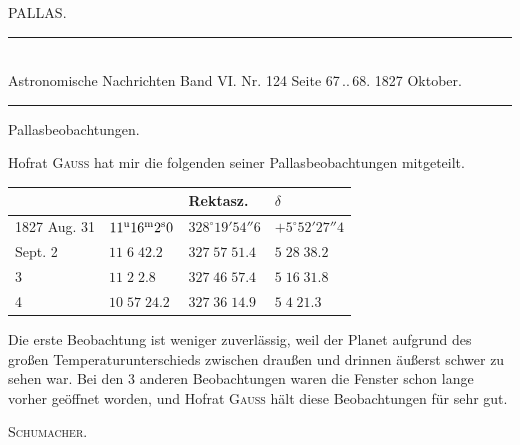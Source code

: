 \clearpage
{}
\hypertarget{native-465-pallas}{}
\begin{center}{\large PALLAS.}\end{center}

\begin{center}
\rule{0.55\linewidth}{0.4pt}\\[2pt]
Astronomische Nachrichten Band VI. Nr. 124 Seite 67\,..\,68. 1827 Oktober.\\[2pt]
\rule{0.55\linewidth}{0.4pt}
\end{center}

\begin{center}Pallasbeobachtungen.\end{center}

Hofrat \textsc{Gauss} hat mir die folgenden seiner Pallasbeobachtungen mitgeteilt.

\begin{center}
\begin{tabular}{l|l|l|l}
 & & Rektasz. & $\delta$ \\
\hline
1827 Aug. 31 & $11^{\rm u}16^{\rm m}2^{\rm s}0$ & $328^\circ19'54''6$ & $+5^\circ52'27''4$ \\
\hfill Sept. 2 & $11\;6\;42.2$ & $327\;57\;51.4$ & $5\;28\;38.2$ \\
\hfill 3 & $11\;2\;2.8$ & $327\;46\;57.4$ & $5\;16\;31.8$ \\
\hfill 4 & $10\;57\;24.2$ & $327\;36\;14.9$ & $5\;4\;21.3$ \\
\end{tabular}
\end{center}

Die erste Beobachtung ist weniger zuverlässig, weil der Planet aufgrund des großen Temperaturunterschieds zwischen draußen und drinnen äußerst schwer zu sehen war. Bei den 3 anderen Beobachtungen waren die Fenster schon lange vorher geöffnet worden, und Hofrat \textsc{Gauss} hält diese Beobachtungen für sehr gut.
\begin{flushright}\textsc{Schumacher.}\end{flushright}

